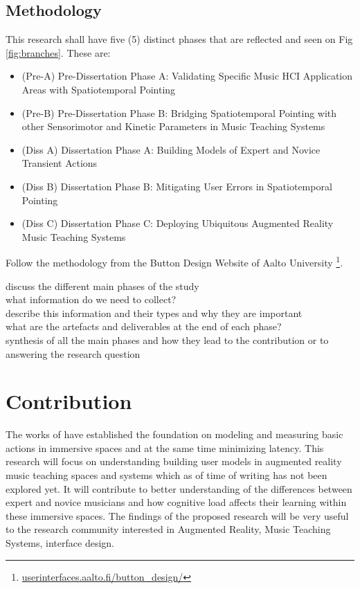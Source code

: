 \documentclass{article}
\begin{document}
\subsection{Methodology}
This research shall have five (5) distinct phases that are reflected and seen on Fig \ref{fig:branches}. These are:
\begin{itemize}
    \item (Pre-A) Pre-Dissertation Phase A: Validating Specific Music HCI Application Areas with Spatiotemporal Pointing
    \item (Pre-B) Pre-Dissertation Phase B: Bridging Spatiotemporal Pointing with other Sensorimotor and Kinetic Parameters in Music Teaching Systems
    \item (Diss A) Dissertation Phase A: Building Models of Expert and Novice Transient Actions
    \item (Diss B) Dissertation Phase B: Mitigating User Errors in Spatiotemporal Pointing
    \item (Diss C) Dissertation Phase C: Deploying Ubiquitous Augmented Reality Music Teaching Systems
\end{itemize}

Follow the methodology from the Button Design Website of Aalto University \footnote{\url{userinterfaces.aalto.fi/button_design/}}. 

discuss the different main phases of the study\\
what information do we need to collect?\\
describe this information and their types and why they are important\\
what are the artefacts and deliverables at the end of each phase?\\
synthesis of all the main phases and how they lead to the contribution or to answering the research question\\
\section{Contribution}
The works of \cite{liao2020button, lee2019geometrically} have established the foundation on modeling and measuring basic actions in immersive spaces and at the same time minimizing latency. This research will focus on understanding building user models in augmented reality music teaching spaces and systems which as of time of writing has not been explored yet. It will contribute to better understanding of the differences between expert and novice musicians and how cognitive load affects their learning within these immersive spaces. The findings of the proposed research will be very useful to the research community interested in Augmented Reality, Music Teaching Systems, interface design. 




\end{document}

